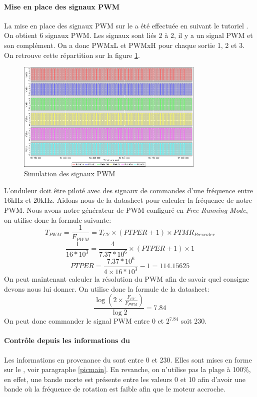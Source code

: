   			\paragraph{Mise en place des signaux PWM}
  			La mise en place des signaux PWM sur le \dspic a été effectuée en suivant le tutoriel \cite{PWMds}. On obtient 6 signaux PWM. Les signaux sont liés 2 à 2, il y a un signal PWM et son complément. On a donc PWMxL et PWMxH pour chaque sortie 1, 2 et 3. On retrouve cette répartition sur la figure \ref{imgPWM}.\\
  			\begin{figure}[h]\begin{center}
	  			\includegraphics[width=0.8\textwidth]{../Illus/pwm100.png}
	  			\caption{Simulation des signaux PWM}
	  			\label{imgPWM}
	  			\end{center}
  			\end{figure}
  			L'onduleur doit être piloté avec des signaux de commandes d'une fréquence entre 16kHz et 20kHz. Aidons nous de la datasheet \cite{DatasheetDSPIC} pour calculer la fréquence de notre PWM. Nous avons notre générateur de PWM configuré en \textit{Free Running Mode}, on utilise donc la formule suivante:
  			$$T_{PWM}=\frac{1}{F_{PWM}}=T_{CY}\times (PTPER+1)\times PTMR_{Prescaler}$$
  			$$\frac{1}{16*10^{3}}=\frac{4}{7.37*10^6}\times (PTPER+1)\times 1$$
  			$$PTPER=\frac{7.37*10^6}{4 \times 16*10^3}-1=114.15625 $$ 
  			On peut maintenant calculer la résolution du PWM afin de savoir quel consigne devons nous lui donner. On utilise donc la formule de la datasheet:
  			$$\frac{\log\left(2 \times \frac{F_{CY}}{F_{PWM}}\right)}{\log 2}=7.84$$
  			On peut donc commander le signal PWM entre 0 et $2^{7.84}$ soit 230.
			\paragraph{Contrôle depuis les informations du \pic}
			Les informations en provenance du \pic sont entre 0 et 230. Elles sont mises en forme sur le \pic, voir paragraphe \ref{picmain}. En revanche, on n'utilise pas la plage à 100\%, en effet, une bande morte est présente entre les valeurs 0 et 10 afin d'avoir une bande où la fréquence de rotation est faible afin que le moteur accroche.
